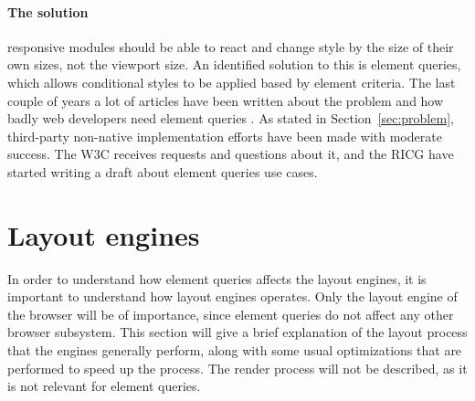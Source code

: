 \documentclass[a4paper,11pt]{kth-mag}
\begin{document}
        \paragraph{The solution}
        \Gls{responsive} modules should be able to react and change style by the size of their own sizes, not the \gls{viewport} size.
        An identified solution to this is element queries, which allows conditional styles to be applied based by \gls{element} criteria.
        The last couple of years a lot of articles have been written about the problem and how badly \gls{web} developers need element queries \cite{eq_article_localised-css,eq_article_backalley,eq_article_mqhack,eq_article_tabatkjr,eq_article_filament,eq_article_tyson,eq_article_neal,eq_article_css-tricks,eq_article_hugo,eq_article_fremycompany,eq_article_discource,eq_article_matt}.
        As stated in Section~\ref{sec:problem}, \gls{third-party} non-\gls{native} implementation efforts have been made with moderate success.
        The \gls{W3C} receives requests and questions about it, and the \gls{RICG} have started writing a draft \cite{ricg_draft} about element queries use cases.

    \section{Layout engines}\label{sec:layout-engines}
      In order to understand how element queries affects the \glspl{layout engine}, it is important to understand how \glspl{layout engine} operates.
      Only the \gls{layout engine} of the \gls{browser} will be of importance, since element queries do not affect any other \gls{browser} subsystem.
      This section will give a brief explanation of the layout process that the engines generally perform, along with some usual optimizations that are performed to speed up the process.
      The render process will not be described, as it is not relevant for element queries.
\end{document}
